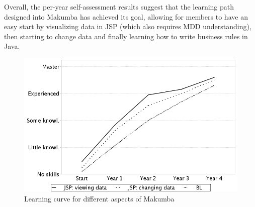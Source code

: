 \documentclass{llncs}
\begin{document}
Overall, the per-year self-assessment results suggest that the learning path designed into Makumba has achieved its goal, allowing for members to have an easy start by visualizing data in JSP (which also requires MDD understanding), then starting to change data and finally learning how to write business rules in Java.

\begin{figure}
   \includegraphics[width=0.98\columnwidth]{figures/learning-technologies}
  \caption{Learning curve for different aspects of Makumba}
  \label{fig:learning-technologies}
\end{figure} 

\end{document}
